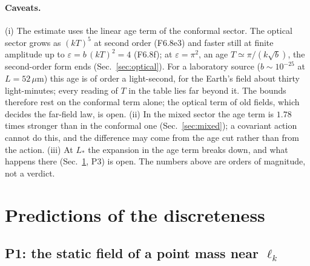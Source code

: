 \paragraph{Caveats.} (i) The estimate uses the linear age term of the conformal sector. The optical sector
grows as $(kT)^5$ at second order (F6.8e3) and faster still at finite amplitude up to $\varepsilon=b\,(kT)^2=4$
(F6.8f); at $\varepsilon=\pi^2$, an age $T\simeq\pi/(k\sqrt b)$, the second-order form ends
(Sec.~\ref{sec:optical}). For a laboratory source ($b\sim10^{-25}$ at $L=52\,\mu$m) this age is of order a
light-second, for the Earth's field about thirty light-minutes; every reading of $T$ in the table lies far beyond
it. The bounds therefore rest on the conformal term alone; the optical term of old fields, which decides the
far-field law, is open. (ii) In the mixed sector the age term is $1.78$ times stronger than in the
conformal one (Sec.~\ref{sec:mixed}); a covariant action cannot do this, and the difference may come from
the age cut rather than from the action. (iii) At $L_*$ the expansion in the age term breaks down, and what
happens there (Sec.~\ref{sec:discreteness-predictions}, P3) is open. The numbers above are orders of
magnitude, not a verdict.

\section{Predictions of the discreteness}\label{sec:discreteness-predictions}

\subsection{P1: the static field of a point mass near \texorpdfstring{$\ell_k$}{l\_k}}

